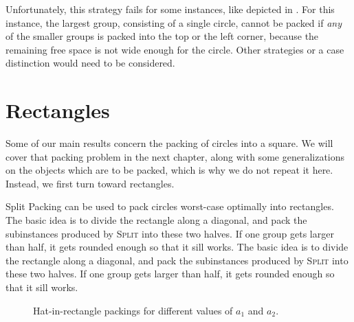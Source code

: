 \documentclass[a4paper,style=print,bibliography=totoc,nexus,lnum,extramargin]{tubsbook}
\begin{document}
Unfortunately, this strategy fails for some instances, like depicted in . For this instance, the largest group, consisting of a single circle, cannot be packed if \emph{any} of the smaller groups is packed into the top or the left corner, because the remaining free space is not wide enough for the circle. Other strategies or a case distinction would need to be considered.


\section{Rectangles}\label{sec:rectangles}

Some of our main results concern the packing of circles into a square. We will cover that packing problem in the next chapter, along with some generalizations on the objects which are to be packed, which is why we do not repeat it here. Instead, we first turn toward rectangles.

Split Packing can be used to pack circles worst-case optimally into rectangles. The basic idea is to divide the rectangle along a diagonal, and pack the subinstances produced by \textsc{Split} into these two halves. If one group gets larger than half, it gets rounded enough so that it sill works. The basic idea is to divide the rectangle along a diagonal, and pack the subinstances produced by \textsc{Split} into these two halves. If one group gets larger than half, it gets rounded enough so that it sill works.

\begin{figure}

    \vspace{5mm}


    \caption{Hat-in-rectangle packings for different values of $a_1$ and $a_2$.}
    \label{fig:hats-in-rect}
\end{figure}
\end{document}

